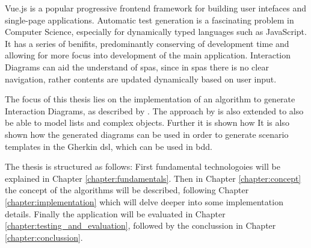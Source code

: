 Vue.js \parencite{vuejs_gh} is a popular progressive frontend framework for building user intefaces and single-page applications. Automatic test generation is a fascinating problem in Computer Science, especially for dynamically typed languages such as JavaScript. It has a series of benifits, predominantly conserving of development time and allowing for more focus into development of the main application. Interaction Diagrams can aid the understand of \glspl{spa}, since in \glspl{spa} there is no clear navigation, rather contents are updated dynamically based on user input. 

The focus of this thesis lies on the implementation of an algorithm to generate Interaction Diagrams, as described by \textcite{zhang2019scenario}. The approach by \textcite{zhang2019scenario} is also  extended to also be able to model lists and complex objects. Further it is shown how It is also shown how the generated diagrams can be used in order to generate scenario templates in the Gherkin \gls{dsl}, which can be used in \gls{bdd}.


The thesis is structured as follows:
First fundamental technologoies will be explained in Chapter \ref{chapter:fundamentals}. Then in Chapter \ref{chapter:concept} the concept of the algorithms will be described, following Chapter \ref{chapter:implementation} which will delve deeper into some implementation details. Finally the application will be evaluated in Chapter \ref{chapter:testing_and_evaluation},
followed by the conclussion in Chapter \ref{chapter:conclussion}.